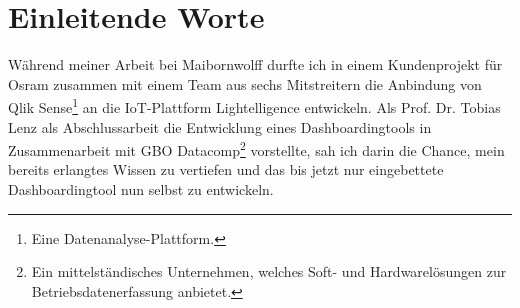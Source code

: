 \chapter*{Einleitende Worte}
\label{chap:einleitende-worte}
Während meiner Arbeit bei Maibornwolff durfte ich in einem
Kundenprojekt für Osram zusammen mit einem Team aus sechs Mitstreitern die
Anbindung von Qlik Sense\footnote{Eine Datenanalyse-Plattform.}
an die IoT-Plattform Lightelligence entwickeln. Als Prof. Dr.
Tobias Lenz als Abschlussarbeit die Entwicklung eines Dashboardingtools
in Zusammenarbeit mit GBO Datacomp\footnote{Ein mittelständisches Unternehmen,
welches Soft- und Hardwarelösungen zur Betriebsdatenerfassung anbietet.} vorstellte, sah ich darin die
Chance, mein bereits erlangtes Wissen zu vertiefen und das bis jetzt
nur eingebettete Dashboardingtool nun selbst zu entwickeln.
